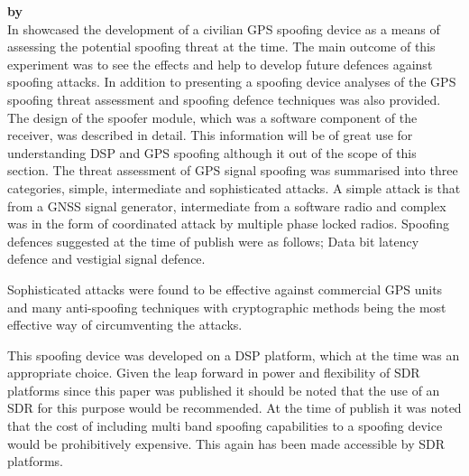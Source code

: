 \medskip

\textbf{\emph{} by \citeauthor{RN23}} \\
In \citeyear{RN23} \citeauthor{RN23} \cite{RN23} showcased the development of a civilian GPS spoofing device as a means of assessing the potential spoofing 
threat at the time. The main outcome of this experiment was to see the effects and help to develop future defences against spoofing attacks. In addition to 
presenting a spoofing device analyses of the GPS spoofing threat assessment and spoofing defence techniques was also provided. 
The design of the spoofer module, which was a software component of the receiver, was described in detail. This information will be of great use for understanding 
DSP and GPS spoofing although it out of the scope of this section. 
The threat assessment of GPS signal spoofing was summarised into three categories, simple, intermediate and sophisticated attacks. A simple attack is that from a
GNSS signal generator, intermediate from a software radio and complex was in the form of coordinated attack by multiple phase locked radios. 
Spoofing defences suggested at the time of publish were as follows; Data bit latency defence and vestigial signal defence.

Sophisticated attacks were found to be effective against commercial GPS units and many anti-spoofing techniques with cryptographic methods being the most 
effective way of circumventing the attacks.

This spoofing device was developed on a DSP platform, which at the time was an appropriate choice. Given the leap forward in power and flexibility
of SDR platforms since this paper was published it should be noted that the use of an SDR for this purpose would be recommended. At the time of publish
it was noted that the cost of including multi band spoofing capabilities to a spoofing device would be prohibitively expensive. This again has been made accessible
by SDR platforms. 

\medskip

